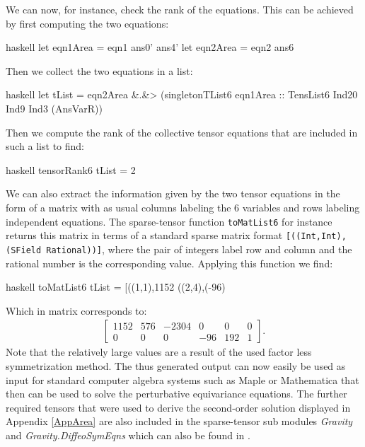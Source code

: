 We can now, for instance, check the rank of the equations. This can be achieved by first computing the two equations:
\begin{center}
\begin{cminted}{haskell}
let eqn1Area = eqn1 ans0' ans4' 
let eqn2Area = eqn2 ans6  
\end{cminted}
\end{center}
Then we collect the two equations in a list:
\begin{center}
\begin{cminted}{haskell}
let tList = eqn2Area &.&> (singletonTList6 eqn1Area ::
            TensList6 Ind20 Ind9 Ind3 (AnsVarR)) 
\end{cminted}
\end{center}
Then we compute the rank of the collective tensor equations that are included in such a list to find:
\begin{center}
\begin{cminted}{haskell}
tensorRank6 tList = 2 
\end{cminted}
\end{center}
We can also extract the information given by the two tensor equations in the form of a matrix with as usual columns labeling the 6 variables and rows labeling independent equations. The sparse-tensor function \texttt{toMatList6} for instance returns this matrix in terms of a standard sparse matrix format \texttt{[((Int,Int),(SField Rational))]}, where the pair of integers label row and column and the rational number is the corresponding value. Applying this function we find:
\begin{center}
\begin{cminted}{haskell}
toMatList6 tList = [((1,1),1152 %
                   ((2,4),(-96) %
\end{cminted}
\end{center}
Which in matrix corresponds to:
\begin{align}
    \begin{bmatrix}
    1152 & 576 & -2304 & 0 & 0 & 0 \\
    0 & 0 & 0 & -96 & 192 & 1
    \end{bmatrix}.
\end{align}
Note that the relatively large values are a result of the used factor less symmetrization method. The thus generated output can now easily be used as input for standard computer algebra systems such as Maple or Mathematica that then can be used to solve the perturbative equivariance equations.
The further required tensors that were used to derive the second-order solution displayed in Appendix \ref{AppArea}
are also included in the sparse-tensor sub modules \textit{Gravity} and \textit{Gravity.DiffeoSymEqns} which can also be found in \cite{sparse-tensor}. 
